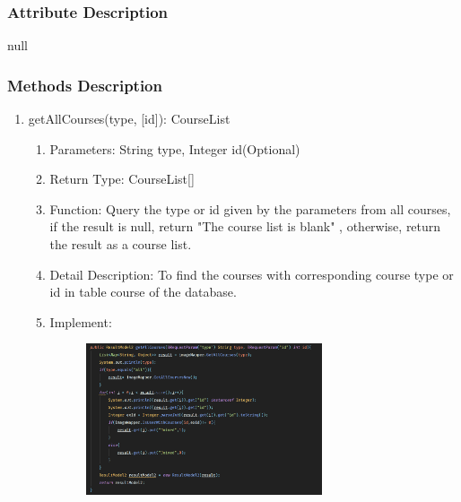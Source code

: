 \documentclass[16pt]{scrreprt}
\begin{document}
\subsubsection{Attribute Description}
null
\subsubsection{Methods Description}
\begin{enumerate}
	\item getAllCourses(type, [id]): CourseList
	\begin{enumerate}
		\item Parameters: String type, Integer id(Optional)
		\item Return Type: CourseList[]
		\item Function: Query the type or id given by the parameters from all courses, if the result is null, return "The course list is blank" , otherwise, return the result as a course list.
		\item Detail Description: To find the courses with corresponding course type or id in table course of the database.
		\item Implement:
		\begin{figure}[H]
	\centering
	\includegraphics[width=0.7\textwidth]{diagrams/getAllCourses.png}\\
\end{figure}
	\end{enumerate}
	

\end{enumerate}
\end{document}

